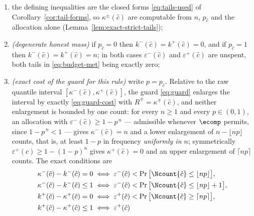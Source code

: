 \begin{proposition}
\begin{enumerate}[label=(\roman*),leftmargin=2.2em]
the largest and $\kappa^{+}(\hat c)$ the smallest integer in $\{0,\dots,n\}$
satisfying the respective inequality of \eqref{eq:exact-admissible}, and
\emph{every} pair $(\tilde k^{-},\tilde k^{+})$ with
$0\le\tilde k^{-}\le\kappa^{-}(\hat c)$ and
$\kappa^{+}(\hat c)\le\tilde k^{+}\le n$ satisfies \eqref{eq:budget-met} in
place of $k^{\mp}(\hat c)$. Enlarging the interval is therefore always
admissible; shrinking it beyond $[\kappa^{-},\kappa^{+}]$ is not;
\item the defining inequalities are the closed forms
\eqref{eq:tails-used} of Corollary~\ref{cor:tail-forms}, so $\kappa^{\pm}(\hat c)$
are computable from $n$, $p_{\hat c}$ and the allocation alone
(Lemma~\ref{lem:exact-strict-tails});
\item \emph{(degenerate honest mass)} if $p_{\hat c}=0$ then
$k^{-}(\hat c)=k^{+}(\hat c)=0$, and if $p_{\hat c}=1$ then
$k^{-}(\hat c)=k^{+}(\hat c)=n$; in both cases $\varepsilon^{-}(\hat c)$ and
$\varepsilon^{+}(\hat c)$ are unspent, both tails in \eqref{eq:budget-met}
being exactly zero;
\item \emph{(exact cost of the guard for this rule)} write $p=p_{\hat c}$.
Relative to the raw quantile interval
$[\kappa^{-}(\hat c),\kappa^{+}(\hat c)]$, the guard \eqref{eq:guard}
enlarges the interval by exactly \eqref{eq:guard-cost} with
$R^{\mp}=\kappa^{\mp}(\hat c)$, and neither enlargement is bounded by one
count: for every $n\ge1$ and every $p\in(0,1)$, an allocation with
$\varepsilon^{-}(\hat c)\ge1-p^{\,n}$ --- admissible whenever $\ecomp$
permits, since $1-p^{\,n}<1$ --- gives $\kappa^{-}(\hat c)=n$ and a lower
enlargement of $n-\lfloor np\rfloor$ counts, that is, at least $1-p$ in
frequency \emph{uniformly in $n$}; symmetrically
$\varepsilon^{+}(\hat c)\ge1-(1-p)^{n}$ gives $\kappa^{+}(\hat c)=0$ and an
upper enlargement of $\lceil np\rceil$ counts. The exact conditions are
\begin{align}
  \kappa^{-}(\hat c)-k^{-}(\hat c)=0
    &\iff \varepsilon^{-}(\hat c)
      <\Pr\big[\Ncount{\hat c}\le\lfloor np\rfloor\big],
    \label{eq:guard-lo0}\\
  \kappa^{-}(\hat c)-k^{-}(\hat c)\le1
    &\iff \varepsilon^{-}(\hat c)
      <\Pr\big[\Ncount{\hat c}\le\lfloor np\rfloor+1\big],
    \label{eq:guard-lo1}\\
  k^{+}(\hat c)-\kappa^{+}(\hat c)=0
    &\iff \varepsilon^{+}(\hat c)
      <\Pr\big[\Ncount{\hat c}\ge\lceil np\rceil\big],
    \label{eq:guard-up0}\\
  k^{+}(\hat c)-\kappa^{+}(\hat c)\le1
    &\iff \varepsilon^{+}(\hat c)

\end{align}
\end{enumerate}
\end{proposition}
